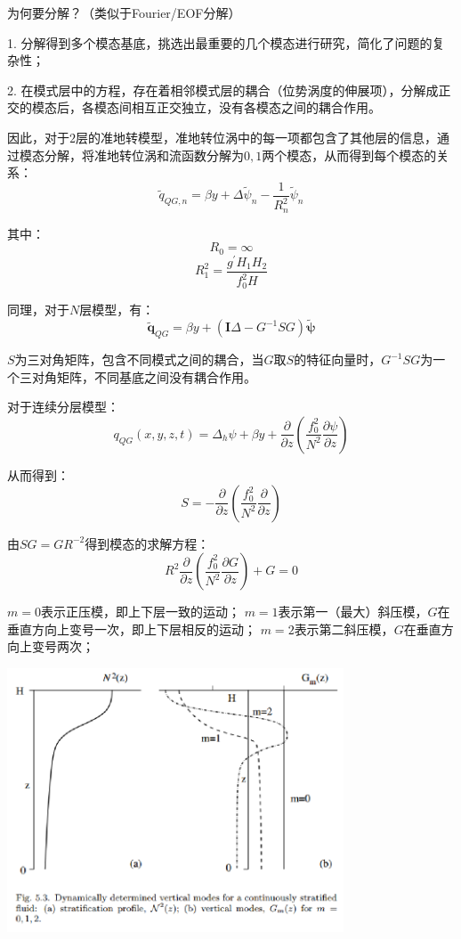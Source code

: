 \documentclass{article}
\begin{document}
为何要分解？（类似于Fourier/EOF分解）

1. 分解得到多个模态基底，挑选出最重要的几个模态进行研究，简化了问题的复杂性；

2. 在模式层中的方程，存在着相邻模式层的耦合（位势涡度的伸展项），分解成正交的模态后，各模态间相互正交独立，没有各模态之间的耦合作用。

因此，对于$2$层的准地转模型，准地转位涡中的每一项都包含了其他层的信息，通过模态分解，将准地转位涡和流函数分解为$0,1$两个模态，从而得到每个模态的关系：
$$\tilde{q}_{QG,n} = \beta y + \Delta \tilde{\psi}_n - \frac{1}{R_n^2}\tilde{\psi}_n$$

其中：
$$R_0 = \infty$$
$$R_1^2 = \frac{g^{\prime}H_1H_2}{f_0^2H}$$

同理，对于$N$层模型，有：
$$\tilde{\mathbf{q}}_{QG} = \beta y + (\mathbf{I}\Delta - G^{-1}SG)\tilde{\mathbf{\psi}}$$

$S$为三对角矩阵，包含不同模式之间的耦合，当$G$取$S$的特征向量时，$G^{-1}SG$为一个三对角矩阵，不同基底之间没有耦合作用。

对于连续分层模型：
$$q_{QG}(x,y,z,t) = \Delta_h \psi + \beta y + \frac{\partial}{\partial z}\left(\frac{f_0^2}{N^2}\frac{\partial\psi}{\partial z}\right)$$

从而得到：
$$S = -\frac{\partial}{\partial z}\left(\frac{f_0^2}{N^2}\frac{\partial}{\partial z}\right)$$

由$SG=GR^{-2}$得到模态的求解方程：
$$  R^2\frac{\partial}{\partial z}\left(\frac{f_0^2}{N^2}\frac{\partial G}{\partial z}\right) + G=0$$

$m=0$表示正压模，即上下层一致的运动；
$m=1$表示第一（最大）斜压模，$G$在垂直方向上变号一次，即上下层相反的运动；
$m=2$表示第二斜压模，$G$在垂直方向上变号两次；
\begin{center}
    \includegraphics[width=10cm]{Fig4_2.png}
\end{center}
\end{document}
